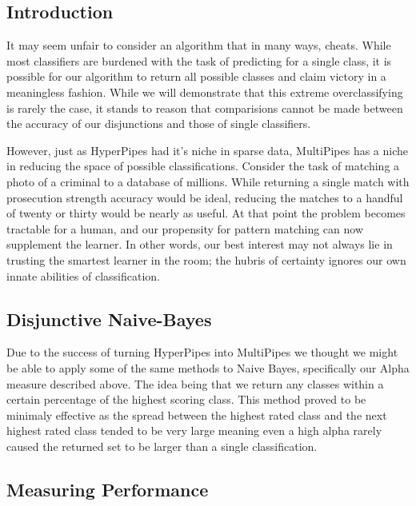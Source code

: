 \subsection{Introduction}
It may seem unfair to consider an algorithm that in many ways, cheats. While most classifiers are burdened with the task of predicting for a single class, it is possible for our algorithm to return all possible classes and claim victory in a meaningless fashion. While we will demonstrate that this extreme overclassifying is rarely the case, it stands to reason that comparisions cannot be made between the accuracy of our disjunctions and those of single classifiers.

However, just as HyperPipes had it's niche in sparse data, MultiPipes has a niche in reducing the space of possible classifications. Consider the task of matching a photo of a criminal to a database of millions. While returning a single match with prosecution strength accuracy would be ideal, reducing the matches to a handful of twenty or thirty would be nearly as useful. At that point the problem becomes tractable for a human, and our propensity for pattern matching can now supplement the learner. In other words, our best interest may not always lie in trusting the smartest learner in the room; the hubris of certainty ignores our own innate abilities of classification.

\subsection{Disjunctive Naive-Bayes}
Due to the success of turning HyperPipes into MultiPipes we thought we might be able to apply some of the same methods to Naive Bayes, specifically our Alpha measure described above. The idea being that we return any classes within a certain percentage of the highest scoring class. This method proved to be minimaly effective as the spread between the highest rated class and the next highest rated class tended to be very large meaning even a high alpha rarely caused the returned set to be larger than a single classification. 
\subsection{Measuring Performance}
